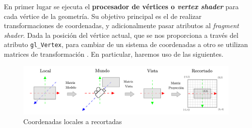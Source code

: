 En primer lugar se ejecuta el \textbf{procesador de vértices o \textit{vertex shader}} para cada vértice de la geometría. Su objetivo principal es el de realizar transformaciones de coordenadas, y adicionalmente pasar atributos al \textit{fragment shader}. Dada la posición del vértice actual, que se nos proporciona a través del atributo \texttt{gl\_Vertex}, para cambiar de un sistema de coordenadas a otro se utilizan matrices de transformación \cite{article:matrices} \cite{article:matrices2}. En particular, haremos uso de las siguientes.
\begin{figure}[h]
    \centering
    \includegraphics[width=\textwidth]{Plantilla-TFG-master/img/matrices2.png}
    \caption{Coordenadas locales a recortadas}
    \label{fig:matrices}
\end{figure}
